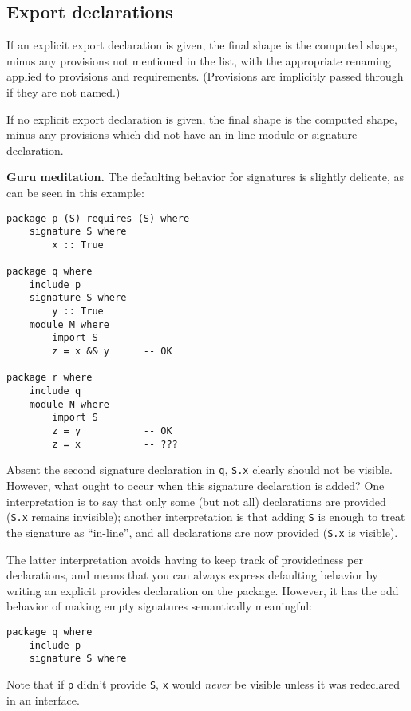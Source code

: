 \documentclass{article}
\newenvironment{aside}
  {\begin{mdframed}[style=0,%
      leftline=false,rightline=false,leftmargin=2em,rightmargin=2em,%
          innerleftmargin=0pt,innerrightmargin=0pt,linewidth=0.75pt,%
      skipabove=7pt,skipbelow=7pt]\small}
  {\end{mdframed}}
\begin{document}
\newpage

\subsection{Export declarations}

If an explicit export declaration is given, the final shape is the
computed shape, minus any provisions not mentioned in the list, with the
appropriate renaming applied to provisions and requirements.  (Provisions
are implicitly passed through if they are not named.)

If no explicit export declaration is given, the final shape is
the computed shape, minus any provisions which did not have an in-line
module or signature declaration.

\begin{aside}
\textbf{Guru meditation.}  The defaulting behavior for signatures
is slightly delicate, as can be seen in this example:

\begin{verbatim}
package p (S) requires (S) where
    signature S where
        x :: True

package q where
    include p
    signature S where
        y :: True
    module M where
        import S
        z = x && y      -- OK

package r where
    include q
    module N where
        import S
        z = y           -- OK
        z = x           -- ???
\end{verbatim}

Absent the second signature declaration in \verb|q|, \verb|S.x| clearly
should not be visible.  However, what ought to occur when this signature
declaration is added?  One interpretation is to say that only some
(but not all) declarations are provided (\verb|S.x| remains invisible);
another interpretation is that adding \verb|S| is enough to treat
the signature as ``in-line'', and all declarations are now provided
(\verb|S.x| is visible).

The latter interpretation avoids having to keep track of providedness
per declarations, and means that you can always express defaulting
behavior by writing an explicit provides declaration on the package.
However, it has the odd behavior of making empty signatures semantically
meaningful:

\begin{verbatim}
package q where
    include p
    signature S where
\end{verbatim}

Note that if \verb|p| didn't provide \verb|S|, \verb|x| would \emph{never}
be visible unless it was redeclared in an interface.
\end{aside}
%
\end{document}
